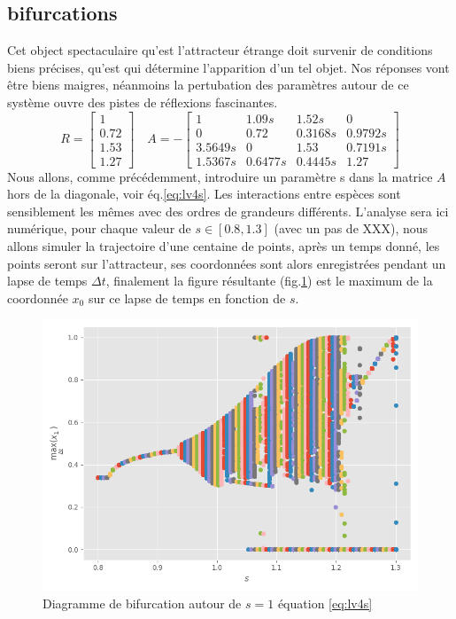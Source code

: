 \documentclass{wsdcr}
\begin{document}
\subsection{bifurcations}
Cet object spectaculaire qu'est l'attracteur étrange doit survenir de conditions biens précises, qu'est qui détermine l'apparition d'un tel objet. Nos réponses vont être biens maigres, néanmoins la pertubation des paramètres autour de ce système ouvre des pistes de réflexions fascinantes.
\begin{equation}
R={\begin{bmatrix}1\\0.72\\1.53\\1.27\end{bmatrix}}\quad A =-{\begin{bmatrix}1&1.09s&1.52s&0\\0&0.72&0.3168s&0.9792s\\3.5649s&0&1.53&0.7191s\\1.5367s&0.6477s&0.4445s&1.27\end{bmatrix}}
\label{eq:lv4s}
\end{equation}
Nous allons, comme précédemment, introduire un paramètre s dans la matrice $A$ hors de la diagonale, voir éq.\ref{eq:lv4s}. Les interactions entre espèces sont sensiblement les mêmes avec des ordres de grandeurs différents. L'analyse sera ici numérique, pour chaque valeur de $s\in [0.8,1.3]$ (avec un pas de XXX), nous allons simuler la trajectoire d'une centaine de points, après un temps donné, les points seront sur l'attracteur, ses coordonnées sont alors enregistrées pendant un lapse de temps $\Delta t$, finalement la figure résultante (fig.\ref{fig:bif4}) est le maximum de la coordonnée $x_0$ sur ce lapse de temps en fonction de $s$. 
\begin{figure}
    \centering
    \includegraphics[width=\linewidth]{fig/lv4_bif.png}
    \caption{Diagramme de bifurcation autour de $s=1$ équation \ref{eq:lv4s}}
    \label{fig:bif4}
\end{figure}
\end{document}
